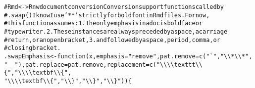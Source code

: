 \documentclass{article}\usepackage[]{graphicx}\usepackage[]{color}
\makeatletter
\newcommand{\hlstr}[1]{\textcolor[rgb]{0.863,0.196,0.184}{#1}}%
\newcommand{\hlcom}[1]{\textcolor[rgb]{0.345,0.431,0.459}{#1}}%
\newcommand{\hlstd}[1]{\textcolor[rgb]{0.514,0.58,0.588}{#1}}%
\newcommand{\hlkwa}[1]{\textcolor[rgb]{0.796,0.294,0.086}{#1}}%
\newcommand{\hlkwb}[1]{\textcolor[rgb]{0.522,0.6,0}{#1}}%
\newcommand{\hlkwc}[1]{\textcolor[rgb]{0.796,0.294,0.086}{#1}}%
\newcommand{\hlkwd}[1]{\textcolor[rgb]{0.576,0.631,0.631}{#1}}%
\newenvironment{kframe}{%
 \def\at@end@of@kframe{}%
 \ifinner\ifhmode%
  \def\at@end@of@kframe{\end{minipage}}%
  \begin{minipage}{\columnwidth}%
 \fi\fi%
 \def\FrameCommand##1{\hskip\@totalleftmargin \hskip-\fboxsep
 \colorbox{shadecolor}{##1}\hskip-\fboxsep
     \hskip-\linewidth \hskip-\@totalleftmargin \hskip\columnwidth}%
 \MakeFramed {\advance\hsize-\width
   \@totalleftmargin\z@ \linewidth\hsize
   \@setminipage}}%
 {\par\unskip\endMakeFramed%
 \at@end@of@kframe}
\newenvironment{knitrout}{}{} %
\makeatother
\begin{document}
\begin{knitrout}
\color{fgcolor}\begin{kframe}
\begin{alltt}
\hlcom{# Rmd <-> Rnw document conversion Conversion support functions called by}
\hlcom{# .swap() I know I use '**' strictly for bold font in Rmd files.  For now,}
\hlcom{# this function assumes: 1. The only emphasis in a doc is boldface or}
\hlcom{# typewriter.  2. These instances are always preceded by a space, a carriage}
\hlcom{# return, or an open bracket, 3. and followed by a space, period, comma, or}
\hlcom{# closing bracket.}
\hlstd{.swapEmphasis} \hlkwb{<-} \hlkwa{function}\hlstd{(}\hlkwc{x}\hlstd{,} \hlkwc{emphasis} \hlstd{=} \hlstr{"remove"}\hlstd{,} \hlkwc{pat.remove} \hlstd{=} \hlkwd{c}\hlstd{(}\hlstr{"`"}\hlstd{,} \hlstr{"\textbackslash{}\textbackslash{}*\textbackslash{}\textbackslash{}*"}\hlstd{,}
    \hlstr{"__"}\hlstd{),} \hlkwc{pat.replace} \hlstd{= pat.remove,} \hlkwc{replacement} \hlstd{=} \hlkwd{c}\hlstd{(}\hlstr{"\textbackslash{}\textbackslash{}\textbackslash{}\textbackslash{}texttt\textbackslash{}\textbackslash{}\{"}\hlstd{,} \hlstr{"\textbackslash{}\textbackslash{}\textbackslash{}\textbackslash{}textbf\textbackslash{}\textbackslash{}\{"}\hlstd{,}
    \hlstr{"\textbackslash{}\textbackslash{}\textbackslash{}\textbackslash{}textbf\textbackslash{}\textbackslash{}\{"}\hlstd{,} \hlstr{"\textbackslash{}\textbackslash{}\}"}\hlstd{,} \hlstr{"\textbackslash{}\textbackslash{}\}"}\hlstd{,} \hlstr{"\textbackslash{}\textbackslash{}\}"}\hlstd{)) \{}


\end{alltt}
\end{kframe}
\end{knitrout}
\end{document}
